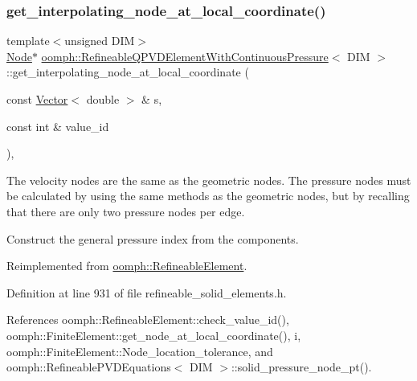 \subsubsection{\texorpdfstring{get\+\_\+interpolating\+\_\+node\+\_\+at\+\_\+local\+\_\+coordinate()}{get\_interpolating\_node\_at\_local\_coordinate()}}
{\footnotesize\ttfamily template$<$unsigned D\+IM$>$ \\
\hyperlink{classoomph_1_1Node}{Node}$\ast$ \hyperlink{classoomph_1_1RefineableQPVDElementWithContinuousPressure}{oomph\+::\+Refineable\+Q\+P\+V\+D\+Element\+With\+Continuous\+Pressure}$<$ D\+IM $>$\+::get\+\_\+interpolating\+\_\+node\+\_\+at\+\_\+local\+\_\+coordinate (\begin{DoxyParamCaption}\item[{const \hyperlink{classoomph_1_1Vector}{Vector}$<$ double $>$ \&}]{s,  }\item[{const int \&}]{value\+\_\+id }\end{DoxyParamCaption})\hspace{0.3cm}{\ttfamily [inline]}, {\ttfamily [virtual]}}



The velocity nodes are the same as the geometric nodes. The pressure nodes must be calculated by using the same methods as the geometric nodes, but by recalling that there are only two pressure nodes per edge. 

Construct the general pressure index from the components. 

Reimplemented from \hyperlink{classoomph_1_1RefineableElement_ad920e66c00888c450f926f08c7793f78}{oomph\+::\+Refineable\+Element}.



Definition at line 931 of file refineable\+\_\+solid\+\_\+elements.\+h.



References oomph\+::\+Refineable\+Element\+::check\+\_\+value\+\_\+id(), oomph\+::\+Finite\+Element\+::get\+\_\+node\+\_\+at\+\_\+local\+\_\+coordinate(), i, oomph\+::\+Finite\+Element\+::\+Node\+\_\+location\+\_\+tolerance, and oomph\+::\+Refineable\+P\+V\+D\+Equations$<$ D\+I\+M $>$\+::solid\+\_\+pressure\+\_\+node\+\_\+pt().

\mbox{\label{classoomph_1_1RefineableQPVDElementWithContinuousPressure_a207dc7a156db01065f965adf6cfc41fd}} 
